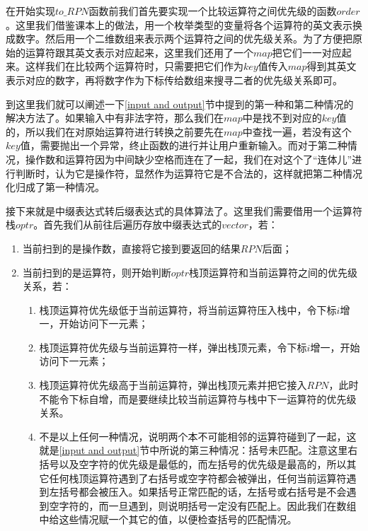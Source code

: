 \documentclass[UTF8]{ctexart}
\begin{document}
		\indent 在开始实现$to\_RPN$函数前我们首先要实现一个比较运算符之间优先级的函数$order$。这里我们借鉴课本\cite{data_structure}上的做法，用一个枚举类型的变量将各个运算符的英文表示换成数字。然后用一个二维数组来表示两个运算符之间的优先级关系。为了方便把原始的运算符跟其英文表示对应起来，这里我们还用了一个$map$把它们一一对应起来。这样我们在比较两个运算符时，只需要把它们作为$key$值传入$map$得到其英文表示对应的数字，再将数字作为下标传给数组来搜寻二者的优先级关系即可。
				
		\indent 到这里我们就可以阐述一下\ref{input and output}节中提到的第一种和第二种情况的解决方法了。如果输入中有非法字符，那么我们在$map$中是找不到对应的$key$值的，所以我们在对原始运算符进行转换之前要先在$map$中查找一遍，若没有这个$key$值，需要抛出一个异常，终止函数的进行并让用户重新输入。而对于第二种情况，操作数和运算符因为中间缺少空格而连在了一起，我们在对这个了“连体儿”进行判断时，认为它是操作符，显然作为运算符它是不合法的，这样就把第二种情况化归成了第一种情况。
		
		\indent 接下来就是中缀表达式转后缀表达式的具体算法了。这里我们需要借用一个运算符栈$optr$。首先我们从前往后遍历存放中缀表达式的$vector$，若：
		\begin{enumerate}
			\item 当前扫到的是操作数，直接将它接到要返回的结果$RPN$后面；
			\item 当前扫到的是运算符，则开始判断$optr$栈顶运算符和当前运算符之间的优先级关系，若：
			\begin{enumerate}
				\item 栈顶运算符优先级低于当前运算符，将当前运算符压入栈中，令下标$i$增一，开始访问下一元素；
				\item 栈顶运算符优先级与当前运算符一样，弹出栈顶元素，令下标$i$增一，开始访问下一元素；
				\item 栈顶运算符优先级高于当前运算符，弹出栈顶元素并把它接入$RPN$，此时不能令下标自增，而是要继续比较当前运算符与栈中下一运算符的优先级关系。
				\item 不是以上任何一种情况，说明两个本不可能相邻的运算符碰到了一起，这就是\ref{input and output}节中所说的第三种情况：括号未匹配。注意这里右括号以及空字符的优先级是最低的，而左括号的优先级是最高的，所以其它任何栈顶运算符遇到了右括号或空字符都会被弹出，任何当前运算符遇到左括号都会被压入。如果括号正常匹配的话，左括号或右括号是不会遇到空字符的，而一旦遇到，则说明括号一定没有匹配上。因此我们在数组中给这些情况赋一个其它的值，以便检查括号的匹配情况。
			\end{enumerate}

		\end{enumerate}	
		
\end{document}
